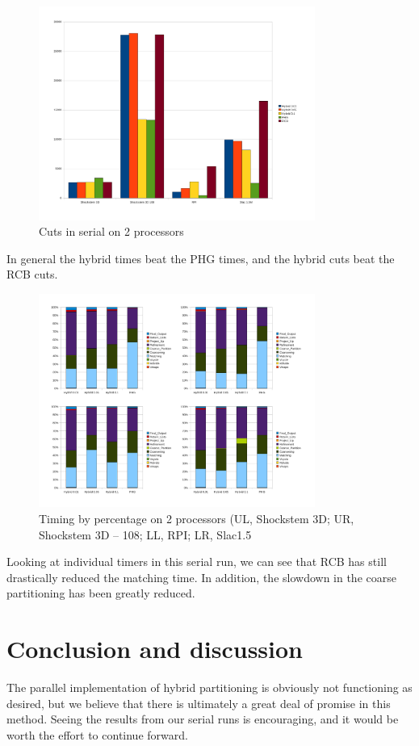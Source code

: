 \documentclass[12pt]{article}
\begin{document}
\begin{figure}[hgp]
  \centering
  \includegraphics[width=\textwidth, height=70mm]{2_cutl.pdf}
  \caption{Cuts in serial on 2  processors}\label{fig:Cuts_np_2}
\end{figure}

In general the hybrid times beat the PHG times, and the hybrid cuts beat
the RCB cuts.

\begin{figure}[hgp]
  \centering
  \includegraphics[width=\textwidth, height=70mm]{2_breakdown_percent.pdf}
  \caption{Timing by percentage on 2 processors (UL, Shockstem 3D; UR,
  Shockstem 3D -- 108; LL, RPI; LR, Slac1.5}\label{fig:Percent_np_2}
\end{figure}

Looking at individual timers in this serial run, we can see that RCB has
still drastically reduced the matching time. In addition, the slowdown in
the coarse partitioning has been greatly reduced.

\section{Conclusion and discussion}
The parallel implementation of hybrid partitioning is obviously not
functioning as desired, but we believe that there is ultimately a great
deal of promise in this method. Seeing the results from our serial runs
is encouraging, and it would be worth the effort to continue forward.
\end{document}
